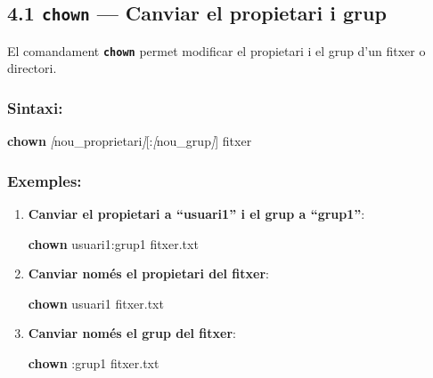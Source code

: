 \documentclass[
  a4paper,
]{article}
\newenvironment{Shaded}{\begin{snugshade}}{\end{snugshade}}
\newcommand{\FunctionTok}[1]{\textcolor[rgb]{0.13,0.29,0.53}{\textbf{#1}}}
\newcommand{\NormalTok}[1]{#1}
\newcommand{\PreprocessorTok}[1]{\textcolor[rgb]{0.56,0.35,0.01}{\textit{#1}}}
\newcommand{\SpecialStringTok}[1]{\textcolor[rgb]{0.31,0.60,0.02}{#1}}
\begin{document}
\subsection{\texorpdfstring{4.1 \texttt{chown} --- Canviar el propietari
i
grup}{4.1 chown --- Canviar el propietari i grup}}\label{chown-canviar-el-propietari-i-grup}

El comandament \textbf{\texttt{chown}} permet modificar el propietari i
el grup d'un fitxer o directori.

\subsubsection{Sintaxi:}\label{sintaxi-2}

\begin{Shaded}
\begin{Highlighting}[]
\FunctionTok{chown} \PreprocessorTok{[}\SpecialStringTok{nou\_proprietari}\PreprocessorTok{]}\NormalTok{[:}\PreprocessorTok{[}\SpecialStringTok{nou\_grup}\PreprocessorTok{]}\NormalTok{] fitxer}
\end{Highlighting}
\end{Shaded}

\subsubsection{Exemples:}\label{exemples-2}

\begin{enumerate}
\def\labelenumi{\arabic{enumi}.}
\item
  \textbf{Canviar el propietari a ``usuari1'' i el grup a ``grup1''}:

\begin{Shaded}
\begin{Highlighting}[]
\FunctionTok{chown}\NormalTok{ usuari1:grup1 fitxer.txt}
\end{Highlighting}
\end{Shaded}
\item
  \textbf{Canviar només el propietari del fitxer}:

\begin{Shaded}
\begin{Highlighting}[]
\FunctionTok{chown}\NormalTok{ usuari1 fitxer.txt}
\end{Highlighting}
\end{Shaded}
\item
  \textbf{Canviar només el grup del fitxer}:

\begin{Shaded}
\begin{Highlighting}[]
\FunctionTok{chown}\NormalTok{ :grup1 fitxer.txt}
\end{Highlighting}
\end{Shaded}
\end{enumerate}
\end{document}
